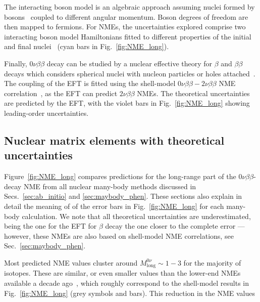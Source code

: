 The interacting boson model is an algebraic approach assuming nuclei formed by bosons~\cite{Iachello:2006fqa} coupled to different angular momentum. Boson degrees of freedom are then mapped to fermions. For NMEs, the uncertainties explored comprise two interacting boson model Hamiltonians fitted to different properties of the initial and final nuclei~\cite{Barea:2015kwa,Deppisch:2020ztt} (cyan bars in Fig.~\ref{fig:NME_long}).

Finally, $0\nu\beta\beta$ decay can be studied by a nuclear effective theory for $\beta$ and $\beta\beta$ decays which considers spherical nuclei with nucleon particles or holes attached~\cite{CoelloPerez:2017xsq,Brase:2021uny}. The coupling of the EFT is fitted using the shell-model $0\nu\beta\beta-2\nu\beta\beta$ NME correlation~\cite{Shimizu:2017qcy}, as the EFT can predict $2\nu\beta\beta$ NMEs. The theoretical uncertainties are predicted by the EFT, with the violet bars in Fig.~\ref{fig:NME_long} showing leading-order uncertainties.

\subsection{Nuclear matrix elements with theoretical uncertainties}
\label{subsec:nme_current}

Figure~\ref{fig:NME_long} compares predictions for the long-range part of the $0\nu\beta\beta$-decay NME from all nuclear many-body methods discussed in Secs.~\ref{sec:ab_initio} and \ref{sec:maybody_phen}. These sections also explain in detail the meaning of of the error bars in Fig.~\ref{fig:NME_long} for each many-body calculation. We note that all theoretical uncertainties are underestimated, being the one for the EFT for $\beta$ decay the one closer to the complete error ---however, these NMEs are also based on shell-model NME correlations, see Sec.~\ref{sec:maybody_phen}.

Most predicted NME values cluster around $M^{0\nu}_\text{long}\sim1-3$ for the majority of isotopes. These are similar, or even smaller values than the lower-end NMEs available a decade ago~\cite{Gomez-Cadenas:2010zcc}, which roughly correspond to the shell-model results in Fig.~\ref{fig:NME_long} (grey symbols and bars). This reduction in the NME values 

